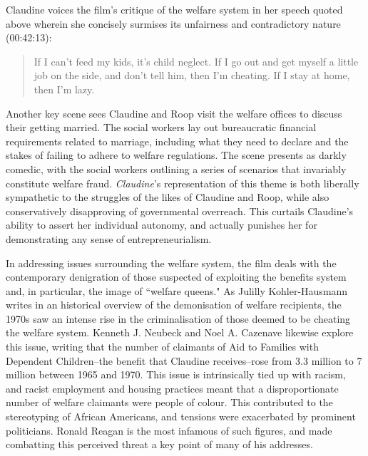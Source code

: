 Claudine voices the film's critique of the welfare system in her speech quoted above wherein she concisely surmises its unfairness and contradictory nature (00:42:13):
\begin{quote}
If I can’t feed my kids, it’s child neglect. If I go out and get myself a little job on the side, and don't tell him, then I’m cheating. If I stay at home, then I’m lazy.
\end{quote}

Another key scene sees Claudine and Roop visit the welfare offices to discuss their getting married.
The social workers lay out bureaucratic financial requirements related to marriage, including what they need to declare and the stakes of failing to adhere to welfare regulations.
The scene presents as darkly comedic, with the social workers outlining a series of scenarios that invariably constitute welfare fraud.
\textit{Claudine}'s representation of this theme is both liberally sympathetic to the struggles of the likes of Claudine and Roop, while also conservatively disapproving of governmental overreach.
This curtails Claudine's ability to assert her individual autonomy, and actually punishes her for demonstrating any sense of entrepreneurialism.


In addressing issues surrounding the welfare system, the film deals with the contemporary denigration of those suspected of exploiting the benefits system and, in particular, the image of ``welfare queens."
As Julilly Kohler-Hausmann writes in an historical overview of the demonisation of welfare recipients, the 1970s saw an intense rise in the criminalisation of those deemed to be cheating the welfare system.\autocite[][756-756]{kohler-hausmann_welfare_2015}
Kenneth J. Neubeck and Noel A. Cazenave likewise explore this issue, writing that the number of claimants of Aid to Families with Dependent Children–the benefit that Claudine receives–rose from 3.3 million to 7 million between 1965 and 1970.\autocite[][121]{neubeck_welfare_2001}
This issue is intrinsically tied up with racism, and racist employment and housing practices meant that a disproportionate number of welfare claimants were people of colour.
This contributed to the stereotyping of African Americans, and tensions were exacerbated by prominent politicians.
Ronald Reagan is the most infamous of such figures, and made combatting this perceived threat a key point of many of his addresses.

